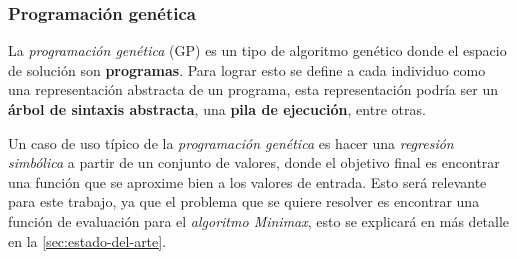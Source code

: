 \subsubsection{Programación genética}
  La \textit{programación genética} (GP)\autocite{langdonFoundationsGeneticProgramming2013} es un tipo de algoritmo 
  genético donde el espacio de solución son \textbf{programas}.
  Para lograr esto se define a cada individuo como una representación abstracta de un programa, esta
  representación podría ser un \textbf{árbol de sintaxis abstracta}, una \textbf{pila de ejecución},
  entre otras.

  Un caso de uso típico de la \textit{programación genética} es hacer una \textit{regresión 
  simbólica}\autocite{poliFieldGuideGenetic2008} a partir de un conjunto de valores, donde el objetivo final es 
  encontrar una función que se aproxime bien a los valores de entrada.
  Esto será relevante para este trabajo, ya que el problema que se quiere resolver es encontrar una
  función de evaluación para el \textit{algoritmo Minimax}, esto se explicará en más detalle en la
  \cref*{sec:estado-del-arte}.
  

